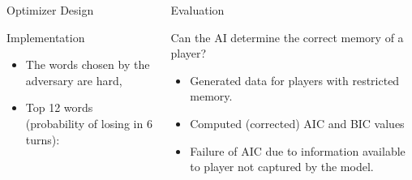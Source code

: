 \documentclass[final]{beamer}
\begin{document}
{\begin{frame}{}
\begin{center}
\begin{columns}[t]
\begin{column}{0.32\textwidth}
\begin{block}{\huge Optimizer Design}
\end{block}

\vspace{1.5cm}

    \begin{block}{\huge Implementation}

\vspace{.5cm}
\begin{itemize}
\item The words chosen by the adversary are hard,
\item Top 12 words {\color{orange}(probability of losing in 6 turns)}:
\end{itemize}

    \end{block}


\end{column}

\begin{column}{0.32\textwidth}

       \begin{block}{\huge Evaluation}

\vspace{1cm}
{\Large Can the AI determine the correct memory of a player?}
\begin{itemize}
\item Generated data for players with restricted memory.
\item Computed (corrected) AIC and BIC values
\item Failure of AIC due to information available to player not captured by the model.
\end{itemize}

\vspace{1cm}


\end{block}
\end{column}
\end{columns}
\end{center}
\end{frame}}
\end{document}
